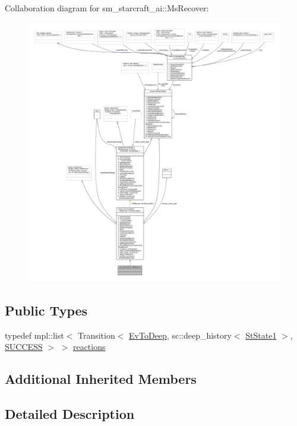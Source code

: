 Collaboration diagram for sm\+\_\+starcraft\+\_\+ai\+:\+:Ms\+Recover\+:
\nopagebreak
\begin{figure}[H]
\begin{center}
\leavevmode
\includegraphics[width=350pt]{classsm__starcraft__ai_1_1MsRecover__coll__graph}
\end{center}
\end{figure}
\subsection*{Public Types}
\begin{DoxyCompactItemize}
\item 
typedef mpl\+::list$<$ Transition$<$ \hyperlink{structsm__starcraft__ai_1_1EvToDeep}{Ev\+To\+Deep}, sc\+::deep\+\_\+history$<$ \hyperlink{structsm__starcraft__ai_1_1StState1}{St\+State1} $>$, \hyperlink{classSUCCESS}{S\+U\+C\+C\+E\+SS} $>$ $>$ \hyperlink{classsm__starcraft__ai_1_1MsRecover_ae8eb85a5831f96fb0699cad678eceb26}{reactions}
\end{DoxyCompactItemize}
\subsection*{Additional Inherited Members}


\subsection{Detailed Description}


